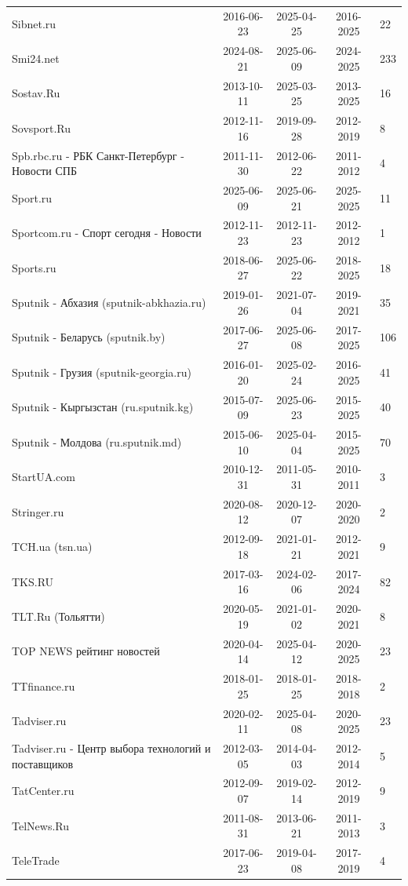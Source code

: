 \begin{longtable}{p{6cm}cccp{2cm}}
Sibnet.ru & 2016-06-23 & 2025-04-25 & 2016-2025 & 22\\
Smi24.net & 2024-08-21 & 2025-06-09 & 2024-2025 & 233\\
Sostav.Ru & 2013-10-11 & 2025-03-25 & 2013-2025 & 16\\
Sovsport.Ru & 2012-11-16 & 2019-09-28 & 2012-2019 & 8\\
Spb.rbc.ru - РБК Санкт-Петербург - Новости СПБ & 2011-11-30 & 2012-06-22 & 2011-2012 & 4\\
Sport.ru & 2025-06-09 & 2025-06-21 & 2025-2025 & 11\\
Sportcom.ru - Спорт сегодня - Новости & 2012-11-23 & 2012-11-23 & 2012-2012 & 1\\
Sports.ru & 2018-06-27 & 2025-06-22 & 2018-2025 & 18\\
Sputnik - Абхазия (sputnik-abkhazia.ru) & 2019-01-26 & 2021-07-04 & 2019-2021 & 35\\
Sputnik - Беларусь (sputnik.by) & 2017-06-27 & 2025-06-08 & 2017-2025 & 106\\
Sputnik - Грузия (sputnik-georgia.ru) & 2016-01-20 & 2025-02-24 & 2016-2025 & 41\\
Sputnik - Кыргызстан (ru.sputnik.kg) & 2015-07-09 & 2025-06-23 & 2015-2025 & 40\\
Sputnik - Молдова (ru.sputnik.md) & 2015-06-10 & 2025-04-04 & 2015-2025 & 70\\
StartUA.com & 2010-12-31 & 2011-05-31 & 2010-2011 & 3\\
Stringer.ru & 2020-08-12 & 2020-12-07 & 2020-2020 & 2\\
TCH.ua (tsn.ua) & 2012-09-18 & 2021-01-21 & 2012-2021 & 9\\
TKS.RU & 2017-03-16 & 2024-02-06 & 2017-2024 & 82\\
TLT.Ru (Тольятти) & 2020-05-19 & 2021-01-02 & 2020-2021 & 8\\
TOP NEWS рейтинг новостей & 2020-04-14 & 2025-04-12 & 2020-2025 & 23\\
TTfinance.ru & 2018-01-25 & 2018-01-25 & 2018-2018 & 2\\
Tadviser.ru & 2020-02-11 & 2025-04-08 & 2020-2025 & 23\\
Tadviser.ru - Центр выбора технологий и поставщиков & 2012-03-05 & 2014-04-03 & 2012-2014 & 5\\
TatCenter.ru & 2012-09-07 & 2019-02-14 & 2012-2019 & 9\\
TelNews.Ru & 2011-08-31 & 2013-06-21 & 2011-2013 & 3\\
TeleTrade & 2017-06-23 & 2019-04-08 & 2017-2019 & 4\\

\end{longtable}
